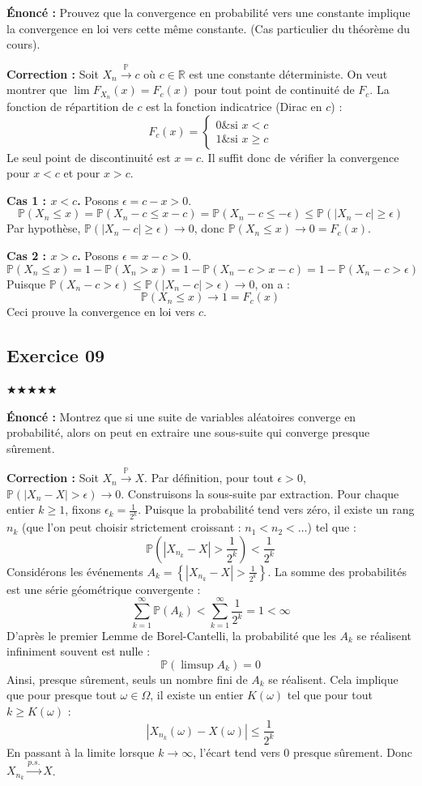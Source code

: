 \documentclass[11pt,a4paper]{article}
\begin{document}
\textbf{Énoncé :}
Prouvez que la convergence en probabilité vers une constante implique la convergence en loi vers cette même constante. (Cas particulier du théorème du cours).

\textbf{Correction :}
Soit $X_n \xrightarrow{\mathbb{P}} c$ où $c \in \mathbb{R}$ est une constante déterministe. On veut montrer que $\lim F_{X_n}(x) = F_c(x)$ pour tout point de continuité de $F_c$.
La fonction de répartition de $c$ est la fonction indicatrice (Dirac en $c$) :
$$ F_c(x) = \begin{cases} 0 \& \text{si } x < c \\ 1 \& \text{si } x \ge c \end{cases} $$
Le seul point de discontinuité est $x = c$. Il suffit donc de vérifier la convergence pour $x < c$ et pour $x > c$.

\textbf{Cas 1 : $x < c$.} Posons $\epsilon = c - x > 0$.
$$ \mathbb{P}(X_n \le x) = \mathbb{P}(X_n - c \le x - c) = \mathbb{P}(X_n - c \le -\epsilon) \le \mathbb{P}(|X_n - c| \ge \epsilon) $$
Par hypothèse, $\mathbb{P}(|X_n - c| \ge \epsilon) \to 0$, donc $\mathbb{P}(X_n \le x) \to 0 = F_c(x)$.

\textbf{Cas 2 : $x > c$.} Posons $\epsilon = x - c > 0$.
$$ \mathbb{P}(X_n \le x) = 1 - \mathbb{P}(X_n > x) = 1 - \mathbb{P}(X_n - c > x - c) = 1 - \mathbb{P}(X_n - c > \epsilon) $$
Puisque $\mathbb{P}(X_n - c > \epsilon) \le \mathbb{P}(|X_n - c| > \epsilon) \to 0$, on a :
$$ \mathbb{P}(X_n \le x) \to 1 = F_c(x) $$
Ceci prouve la convergence en loi vers $c$.


\subsection*{Exercice 09}

\quad $\bigstar\bigstar\bigstar\bigstar\bigstar$

\textbf{Énoncé :}
Montrez que si une suite de variables aléatoires converge en probabilité, alors on peut en extraire une sous-suite qui converge presque sûrement.

\textbf{Correction :}
Soit $X_n \xrightarrow{\mathbb{P}} X$. Par définition, pour tout $\epsilon > 0$, $\mathbb{P}(|X_n - X| > \epsilon) \to 0$.
Construisons la sous-suite par extraction. Pour chaque entier $k \ge 1$, fixons $\epsilon_k = \frac{1}{2^k}$.
Puisque la probabilité tend vers zéro, il existe un rang $n_k$ (que l'on peut choisir strictement croissant : $n_1 < n_2 < \dots$) tel que :
$$ \mathbb{P}\left(|X_{n_k} - X| > \frac{1}{2^k}\right) < \frac{1}{2^k} $$
Considérons les événements $A_k = \left\{|X_{n_k} - X| > \frac{1}{2^k}\right\}$.
La somme des probabilités est une série géométrique convergente :
$$ \sum_{k=1}^\infty \mathbb{P}(A_k) < \sum_{k=1}^\infty \frac{1}{2^k} = 1 < \infty $$
D'après le premier Lemme de Borel-Cantelli, la probabilité que les $A_k$ se réalisent infiniment souvent est nulle :
$$ \mathbb{P}(\limsup A_k) = 0 $$
Ainsi, presque sûrement, seuls un nombre fini de $A_k$ se réalisent. Cela implique que pour presque tout $\omega \in \Omega$, il existe un entier $K(\omega)$ tel que pour tout $k \ge K(\omega)$ :
$$ |X_{n_k}(\omega) - X(\omega)| \le \frac{1}{2^k} $$
En passant à la limite lorsque $k \to \infty$, l'écart tend vers $0$ presque sûrement.
Donc $X_{n_k} \xrightarrow{p.s.} X$.
\end{document}
